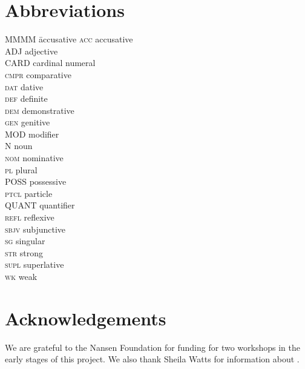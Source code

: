 \documentclass[output=paper,colorlinks,citecolor=brown,draft]{langscibook}
\begin{document}
\section*{Abbreviations}
\begin{multicols}{2}
\begin{tabbing}
MMMM \= accusative\kill
\textsc{acc} \> accusative\\
ADJ \> {adjective} \\
CARD \> cardinal {numeral} \\
\textsc{cmpr} \> {comparative}\\
\textsc{dat} \> {dative}\\
\textsc{def} \> definite\\
\textsc{dem} \> {demonstrative}\\
\textsc{gen} \> {genitive}\\
MOD \> modifier \\
N \> {noun} \\
\textsc{nom} \> {nominative}\\
\textsc{pl} \> plural\\
POSS \> possessive\\
\textsc{ptcl} \> particle \\
QUANT \> {quantifier} \\
\textsc{refl} \> reflexive\\
\textsc{sbjv} \> subjunctive\\
\textsc{sg} \> singular\\
\textsc{str} \> strong\\
\textsc{supl} \> {superlative}\\
\textsc{wk} \> weak\\
\end{tabbing}
\end{multicols}


\section*{Acknowledgements}
We are grateful to the Nansen Foundation for funding for two workshops in the early stages of this project. We also thank Sheila Watts for information about . 



{\sloppy\printbibliography[heading=subbibliography,notkeyword=this]}
\end{document}
